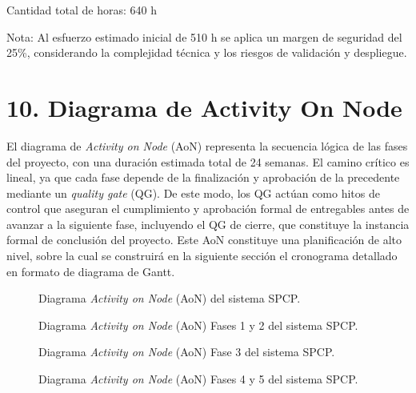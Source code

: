 \documentclass[12pt]
{charter}
\begin{document}
Cantidad total de horas: 640 h

Nota: Al esfuerzo estimado inicial de 510 h se aplica un margen de seguridad del 25\%, considerando la complejidad técnica y los riesgos de validación y despliegue. 


\section{10. Diagrama de Activity On Node}
\label{sec:AoN}

El diagrama de \textit{Activity on Node} (AoN) representa la secuencia lógica de las fases del proyecto, con una duración estimada total de 24 semanas. 
El camino crítico es lineal, ya que cada fase depende de la finalización y aprobación de la precedente mediante un \textit{quality gate} (QG). 
De este modo, los QG actúan como hitos de control que aseguran el cumplimiento y aprobación formal de entregables antes de avanzar a la siguiente fase, incluyendo el QG de cierre, que constituye la instancia formal de conclusión del proyecto. 
Este AoN constituye una planificación de alto nivel, sobre la cual se construirá en la siguiente sección el cronograma detallado en formato de diagrama de Gantt.

\begin{figure}[ht]
  \centering
  \def\svgwidth{\textwidth}
  
  \caption{Diagrama \textit{Activity on Node} (AoN) del sistema SPCP.}
    \label{fig:TF_AoN_00}
\end{figure}

\FloatBarrier

\begin{figure}[ht]
  \centering
  \def\svgwidth{\textwidth}
  
  \caption{Diagrama \textit{Activity on Node} (AoN) Fases 1 y 2 del sistema SPCP.}
    \label{fig:TF_AoN_01_01}
\end{figure}

\FloatBarrier

\begin{figure}[ht]
  \centering
  \def\svgwidth{0.90\textwidth}
  
  \caption{Diagrama \textit{Activity on Node} (AoN) Fase 3 del sistema SPCP.}
    \label{fig:TF_AoN_01_02}
\end{figure}

\FloatBarrier

\begin{figure}[ht]
  \centering
  \def\svgwidth{0.90\textwidth}
  
  \caption{Diagrama \textit{Activity on Node} (AoN) Fases 4 y 5 del sistema SPCP.}
    \label{fig:TF_AoN_01_03}
\end{figure}
\end{document}

